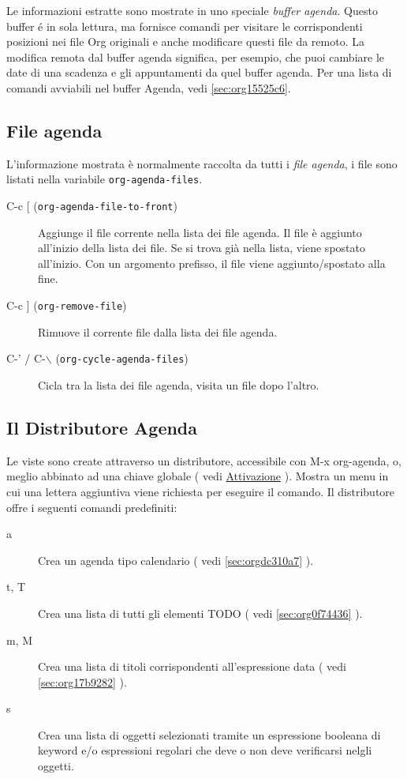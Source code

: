 \documentclass[11pt]{article}
\begin{document}
Le informazioni estratte sono mostrate in uno speciale \emph{buffer
agenda}. Questo buffer é in sola lettura, ma fornisce comandi per
visitare le corrispondenti posizioni nei file Org originali e anche
modificare questi file da remoto. La modifica remota dal buffer agenda
significa, per esempio, che puoi cambiare le date di una scadenza e
gli appuntamenti da quel buffer agenda. Per una lista di comandi
avviabili nel buffer Agenda, vedi \ref{sec:org15525c6}.

\subsection{File agenda}
\label{sec:orgb467595}
L'informazione mostrata è normalmente raccolta da tutti i \emph{file
agenda}, i file sono listati nella variabile \texttt{org-agenda-files}.

\begin{description}
\item[{C-c [ (\texttt{org-agenda-file-to-front})}] Aggiunge il file corrente nella lista dei file agenda. Il file è
aggiunto all'inizio della lista dei file. Se si trova già nella
lista, viene spostato all'inizio. Con un argomento prefisso, il file
viene aggiunto/spostato alla fine.

\item[{C-c ] (\texttt{org-remove-file})}] Rimuove il corrente file dalla lista dei file agenda.

\item[{C-' / C-$\backslash$ (\texttt{org-cycle-agenda-files})}] Cicla tra la lista dei file agenda, visita un file dopo l'altro.
\end{description}

\subsection[Agenda Dispatcher]{Il Distributore Agenda}
\label{sec:orga0feddf}
Le viste sono create attraverso un distributore, accessibile con
M-x org-agenda, o, meglio abbinato ad una chiave globale (
vedi \hyperref[sec:org316fc0b]{Attivazione} ). Mostra un menu in cui una lettera aggiuntiva
viene richiesta per eseguire il comando. Il distributore offre i
seguenti comandi predefiniti:

\begin{description}
\item[{a}] Crea un agenda tipo calendario ( vedi \ref{sec:orgdc310a7} ).

\item[{t, T}] Crea una lista di tutti gli elementi TODO ( vedi \ref{sec:org0f74436}
).

\item[{m, M}] Crea una lista di titoli corrispondenti all'espressione data ( vedi
\ref{sec:org17b9282} ).

\item[{s}] Crea una lista di oggetti selezionati tramite un espressione
booleana di keyword e/o espressioni regolari che deve o non deve
verificarsi nelgli oggetti.
\end{description}
\end{document}
